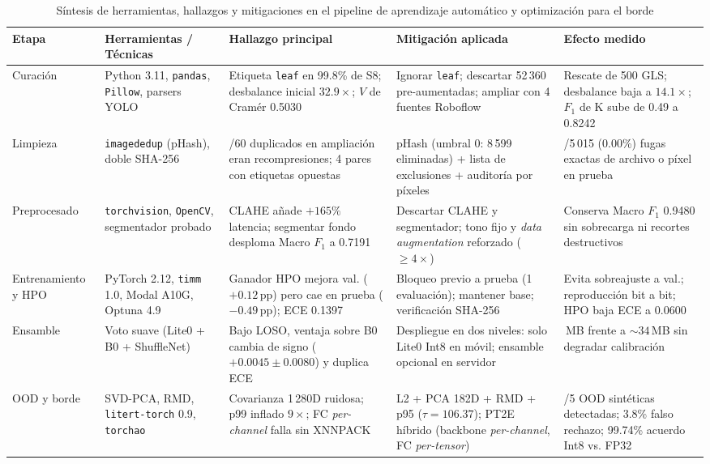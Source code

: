\documentclass[conference,letterpaper]{IEEEtran}
\newcommand{\Fone}{$F_1$}
\begin{document}
\begin{table}[!t]
\caption{Síntesis de herramientas, hallazgos y mitigaciones en el pipeline de aprendizaje automático y optimización para el borde}
\label{tab:pipeline_resumen}
\centering
\scriptsize
\setlength{\tabcolsep}{3.5pt}
\begin{tabularx}{\textwidth}{@{}>{\raggedright\arraybackslash}p{1.85cm}>{\raggedright\arraybackslash}p{2.65cm}>{\raggedright\arraybackslash}p{4.05cm}>{\raggedright\arraybackslash}p{3.95cm}>{\raggedright\arraybackslash}X@{}}
\toprule
\textbf{Etapa} & \textbf{Herramientas / Técnicas} & \textbf{Hallazgo principal} & \textbf{Mitigación aplicada} & \textbf{Efecto medido} \\
\midrule
Curación & Python 3.11, \texttt{pandas}, \texttt{Pillow}, parsers YOLO & Etiqueta \texttt{leaf} en 99.8\% de S8; desbalance inicial $32.9\times$; $V$ de Cramér 0.5030 & Ignorar \texttt{leaf}; descartar 52\,360 pre-aumentadas; ampliar con 4 fuentes Roboflow & Rescate de 500 GLS; desbalance baja a $14.1\times$; \Fone{} de K sube de 0.49 a 0.8242 \\
Limpieza & \texttt{imagededup} (pHash), doble SHA-256 & 56/60 duplicados en ampliación eran recompresiones; 4 pares con etiquetas opuestas & pHash (umbral 0: 8\,599 eliminadas) + lista de exclusiones + auditoría por píxeles & 0/5\,015 (0.00\%) fugas exactas de archivo o píxel en prueba \\
Preprocesado & \texttt{torchvision}, \texttt{OpenCV}, segmentador probado & CLAHE añade $+165\%$ latencia; segmentar fondo desploma Macro \Fone{} a 0.7191 & Descartar CLAHE y segmentador; tono fijo y \textit{data augmentation} reforzado ($\ge4\times$) & Conserva Macro \Fone{} 0.9480 sin sobrecarga ni recortes destructivos \\
Entrenamiento y HPO & PyTorch 2.12, \texttt{timm} 1.0, Modal A10G, Optuna 4.9 & Ganador HPO mejora val. ($+0.12$\,pp) pero cae en prueba ($-0.49$\,pp); ECE 0.1397 & Bloqueo previo a prueba (1 evaluación); mantener base; verificación SHA-256 & Evita sobreajuste a val.; reproducción bit a bit; HPO baja ECE a 0.0600 \\
Ensamble & Voto suave (Lite0 + B0 + ShuffleNet) & Bajo LOSO, ventaja sobre B0 cambia de signo ($+0.0045\pm0.0080$) y duplica ECE & Despliegue en dos niveles: solo Lite0 Int8 en móvil; ensamble opcional en servidor & 3.74\,MB frente a ${\sim}34$\,MB sin degradar calibración \\
OOD y borde & SVD-PCA, RMD, \texttt{litert-torch} 0.9, \texttt{torchao} & Covarianza 1\,280D ruidosa; p99 inflado $9\times$; FC \textit{per-channel} falla sin XNNPACK & L2 + PCA 182D + RMD + p95 ($\tau=106.37$); PT2E híbrido (backbone \textit{per-channel}, FC \textit{per-tensor}) & 5/5 OOD sintéticas detectadas; 3.8\% falso rechazo; 99.74\% acuerdo Int8 vs. FP32 \\
\bottomrule
\end{tabularx}
\end{table}
\end{document}
